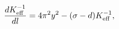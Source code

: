 \begin{equation}
\label{flowK2}
\frac{d K_{\rm eff}^{-1}}{dl}=4\pi^2y^2-(\sigma-d)K_{\rm eff}^{-1},
\end{equation}

